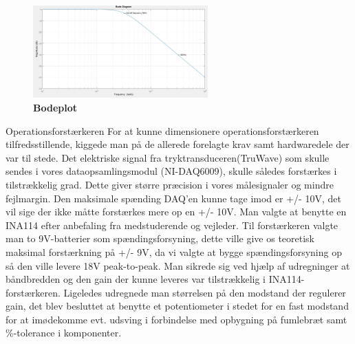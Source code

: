 \begin{figure}[H]
\includegraphics[width =0.6\textwidth , center]{billeder/bodeplot}
\caption{\textbf{Bodeplot}}
\end{figure}
Operationsforstærkeren For at kunne dimensionere operationsforstærkeren tilfredsstillende, kiggede man på de allerede forelagte krav samt hardwaredele der var til stede. Det elektriske signal fra tryktransduceren(TruWave\texttrademark) som skulle sendes i vores dataopsamlingsmodul (NI-DAQ6009), skulle således forstærkes i tilstrækkelig grad. Dette giver større præcision i vores målesignaler og mindre fejlmargin. Den maksimale spænding DAQ’en kunne tage imod er +/- 10V, det vil sige der ikke måtte forstærkes mere op en +/- 10V. Man valgte at benytte en INA114 efter anbefaling fra medstuderende og vejleder. Til forstærkeren valgte man to 9V-batterier som spændingsforsyning, dette ville give os teoretisk maksimal forstærkning på +/- 9V, da vi valgte at bygge spændingsforsyning op så den ville levere 18V peak-to-peak. Man sikrede sig ved hjælp af udregninger at båndbredden og den gain der kunne leveres var tilstrækkelig i INA114-forstærkeren. Ligeledes udregnede man størrelsen på den modstand der regulerer gain, det blev besluttet at benytte et potentiometer i stedet for en fast modstand for at imødekomme evt. udsving i forbindelse med opbygning på fumlebræt samt \%-tolerance i komponenter.
